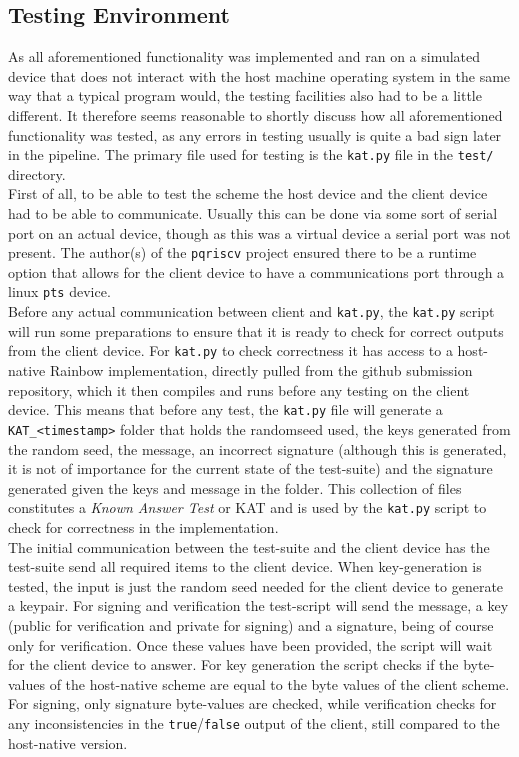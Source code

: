 \subsection{Testing Environment}
As all aforementioned functionality was implemented and ran on a simulated device that does not interact with the host machine operating system in the same way that a typical program would, the testing facilities also had to be a little different. It therefore seems reasonable to shortly discuss how all aforementioned functionality was tested, as any errors in testing usually is quite a bad sign later in the pipeline. The primary file used for testing is the \texttt{kat.py} file in the \texttt{test/} directory.\medskip\\
First of all, to be able to test the scheme the host device and the client device had to be able to communicate. Usually this can be done via some sort of serial port on an actual device, though as this was a virtual device a serial port was not present. The author(s) of the \texttt{pqriscv} project ensured there to be a runtime option that allows for the client device to have a communications port through a linux \texttt{pts} device.\medskip\\
Before any actual communication between client and \texttt{kat.py}, the \texttt{kat.py} script will run some preparations to ensure that it is ready to check for correct outputs from the client device. For \texttt{kat.py} to check correctness it has access to a host-native Rainbow implementation, directly pulled from the github submission repository, which it then compiles and runs before any testing on the client device. This means that before any test, the \texttt{kat.py} file will generate a \texttt{KAT\_<timestamp>} folder that holds the randomseed used, the keys generated from the random seed, the message, an incorrect signature (although this is generated, it is not of importance for the current state of the test-suite) and the signature generated given the keys and message in the folder. This collection of files constitutes a \textit{Known Answer Test} or KAT and is used by the \texttt{kat.py} script to check for correctness in the implementation.\medskip\\
The initial communication between the test-suite and the client device has the test-suite send all required items to the client device. When key-generation is tested, the input is just the random seed needed for the client device to generate a keypair. For signing and verification the test-script will send the message, a key (public for verification and private for signing) and a signature, being of course only for verification. Once these values have been provided, the script will wait for the client device to answer. For key generation the script checks if the byte-values of the host-native scheme are equal to the byte values of the client scheme. For signing, only signature byte-values are checked, while verification checks for any inconsistencies in the \texttt{true}/\texttt{false} output of the client, still compared to the host-native version.

